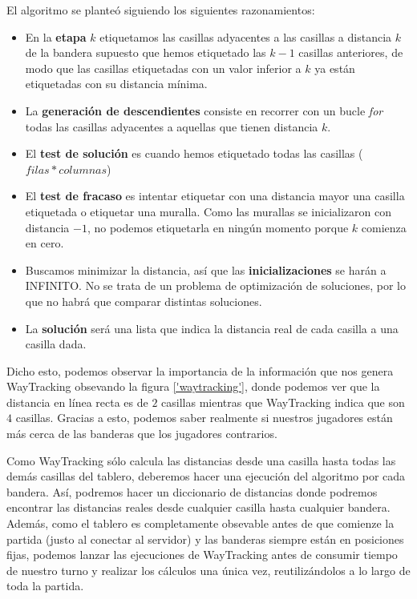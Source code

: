 El algoritmo se planteó siguiendo los siguientes razonamientos:
\begin{itemize}
\item En la \textbf{etapa} $k$ etiquetamos las casillas adyacentes a
  las casillas a distancia $k$ de la bandera supuesto que hemos
  etiquetado las $k-1$ casillas anteriores, de modo que las casillas
  etiquetadas con un valor inferior a $k$ ya están etiquetadas con su
  distancia mínima.
\item La \textbf{generación de descendientes} consiste en recorrer con un bucle
  \emph{for} todas las casillas adyacentes a aquellas que tienen distancia
  $k$.
\item El \textbf{test de solución} es cuando hemos etiquetado todas las casillas
($filas*columnas$)
\item El \textbf{test de fracaso} es intentar etiquetar con una distancia mayor
  una casilla etiquetada o etiquetar una muralla. Como las murallas se
  inicializaron con distancia $-1$, no podemos etiquetarla en ningún
  momento porque $k$ comienza en cero.
\item Buscamos minimizar la distancia, así que las \textbf{inicializaciones} se
  harán a INFINITO. No se trata de un problema de optimización de
  soluciones, por lo que no habrá que comparar distintas
  soluciones.
\item La \textbf{solución} será una lista que indica la distancia real de cada
  casilla a una casilla dada.
\end{itemize}

Dicho esto, podemos observar la importancia de la información que nos
genera WayTracking obsevando la figura \ref{'waytracking'}, donde
podemos ver que la distancia en línea recta es de $2$ casillas
mientras que WayTracking indica que son $4$ casillas. Gracias a esto,
podemos saber realmente si nuestros jugadores están más cerca de las
banderas que los jugadores contrarios.

Como WayTracking sólo calcula las distancias desde una casilla hasta
todas las demás casillas del tablero, deberemos hacer una ejecución
del algoritmo por cada bandera. Así, podremos hacer un diccionario de
distancias donde podremos encontrar las distancias reales desde
cualquier casilla hasta cualquier bandera. Además, como el tablero es
completamente obsevable antes de que comienze la partida (justo al
conectar al servidor) y las banderas siempre están en posiciones
fijas, podemos lanzar las ejecuciones de WayTracking antes de consumir
tiempo de nuestro turno y realizar los cálculos una única vez,
reutilizándolos a lo largo de toda la partida.

